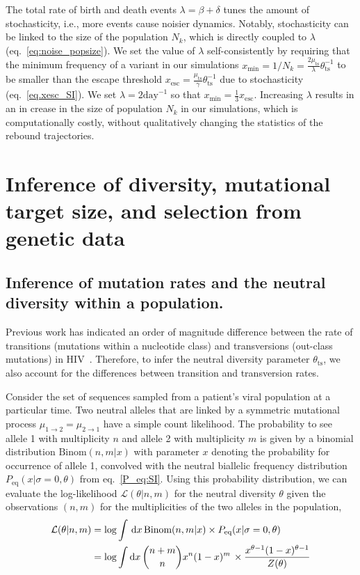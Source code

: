 \documentclass[11pt]{article}
\renewcommand{\d}{{\text d}}
\newcommand{\eq}{{\text{eq}}}
\newcommand{\ts}{{\text{ts}}}
\newcommand{\Binom}{{\text {Binom}}}
\renewcommand{\L}{{\mathcal{L}}}
\begin{document}
The total rate of birth and death events $\lambda=\beta+\delta$ tunes the amount of  stochasticity, i.e.,  more events cause noisier dynamics. Notably, stochasticity can be linked to the size of the population  $N_k$, which is directly coupled to $\lambda$ (eq.~\ref{eq:noise_popsize}). We set the value of $\lambda$ self-consistently by requiring that  the minimum frequency of a variant in our simulations $x_\text{min} = 1/N_k  = \frac{2 \mu_{\ts}}{\lambda} \theta_{\ts}^{-1}$ to be smaller than the  escape threshold $x_\text{esc} = \frac{\mu_{\ts}}{\gamma} \theta_{\ts}^{-1}$ due to stochasticity (eq.~\ref{eq.xesc_SI}). We set $\lambda = 2 \text{day}^{-1}$ so that $x_\text{min} = \frac{1}{3} x_\text{esc}$. Increasing $\lambda$ results in an in crease in the  size of population $N_k$ in our simulations, which is computationally costly, without qualitatively changing the statistics of the rebound trajectories.

\section{Inference of diversity, mutational target size, and selection from genetic data}
\subsection{Inference of mutation rates and the neutral diversity within a population.}
\label{sec:diversity}
Previous work has indicated an order of magnitude difference between  the rate of transitions (mutations within a nucleotide class) and transversions (out-class mutations) in HIV~\cite{nielsenStatisticalMethodsMolecular2006,Zanini:2017in, theysWithinpatientMutationFrequencies2018b, federSpatiotemporalAssessmentSimian2017}.  Therefore, to infer the neutral diversity parameter $\theta_{\ts}$, we also account for the differences between transition and transversion rates.

Consider the set of sequences sampled from a patient's viral population at a particular time. Two neutral alleles that are linked by a symmetric mutational process $\mu_{1\rightarrow2} = \mu_{2\rightarrow1}$  have a simple count likelihood.
The probability to see allele 1 with multiplicity   $n$  and allele 2 with multiplicity $m$  is given by a binomial distribution $\Binom(n,m|x)$ with parameter $x$ denoting the probability for occurrence of allele  1,  convolved with the neutral biallelic frequency distribution $P_\eq(x|\sigma=0,\theta)$ from eq.~\ref{P_eq:SI}. Using this probability distribution,  we can evaluate the log-likelihood $\L(\theta|n,m)$ for the neutral diversity $\theta$ given the observations $(n,m)$ for the multiplicities of the two alleles in the population,
\begin{align}
\label{eq:equilibrium_likelihood}
\L(\theta|n,m) &= \log \int\, \d x \, \Binom(n,m|x) \times P_\eq(x| \sigma=0,\theta) \\
&= \log \int \d x \, {n+m\choose n} x^n (1-x)^m\,\times \frac{x^{\theta-1}(1-x)^{\theta-1}}{Z(\theta)} 
\end{align}
\end{document}
